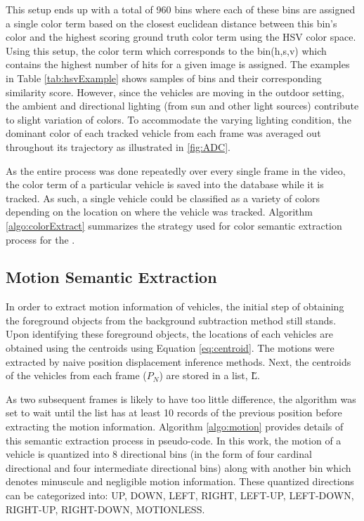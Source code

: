 This setup ends up with a total of 960 bins where each of these bins are assigned a single color term based on the closest euclidean distance between this bin's color and the highest scoring ground truth color term using the HSV color space. Using this setup, the color term which corresponds to the bin(h,s,v) which contains the highest number of hits for a given image is assigned. The examples in Table \ref{tab:hsvExample} shows samples of bins and their corresponding similarity score. However, since the vehicles are moving in the outdoor setting, the ambient and directional lighting (from sun and other light sources) contribute to slight variation of colors. To accommodate the varying lighting condition, the dominant color of each tracked vehicle from each frame was averaged out throughout its trajectory as illustrated in \ref{fig:ADC}. 


As the entire process was done repeatedly over every single frame in the video, the color term of a particular vehicle is saved into the database while it is tracked. As such, a single vehicle could be classified as a variety of colors depending on the location on where the vehicle was tracked. Algorithm \ref{algo:colorExtract} summarizes the strategy used for color semantic extraction process for the \versionOneExt. 



\subsection{Motion Semantic Extraction}


In order to extract motion information of vehicles, the initial step of obtaining the foreground objects from the background subtraction method still stands. Upon identifying these foreground objects, the locations of each vehicles are obtained using the centroids using Equation \ref{eq:centroid}. The motions were extracted by naive position displacement inference methods. Next, the centroids of the vehicles from each frame ($P_N$) are stored in a list, \H{L}. 

As two subsequent frames is likely to have too little difference, the algorithm was set to wait until the list has at least 10 records of the previous position before extracting the motion information. Algorithm \ref{algo:motion} provides details of this semantic extraction process in pseudo-code. In this work, the motion of a vehicle is quantized into 8 directional bins (in the form of four cardinal directional and four intermediate directional bins) along with another bin which denotes minuscule and negligible motion information. These quantized directions can be categorized into: UP, DOWN, LEFT, RIGHT, LEFT-UP, LEFT-DOWN, RIGHT-UP, RIGHT-DOWN, MOTIONLESS. 

